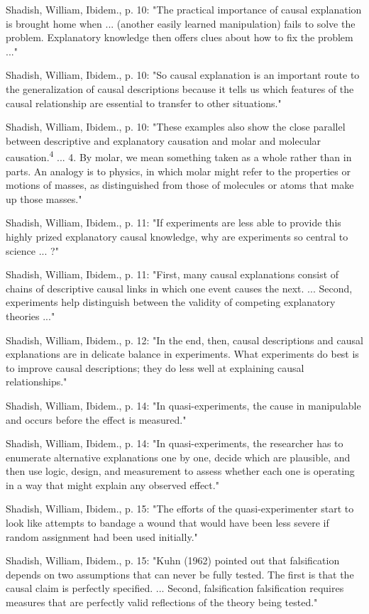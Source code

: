 Shadish, William, Ibidem., p. 10: "The practical importance of causal explanation is brought home when ... (another easily learned manipulation) fails to solve the problem. Explanatory knowledge then offers clues about how to fix the problem ..."

Shadish, William, Ibidem., p. 10: "So causal explanation is an important route to the generalization of causal descriptions because it tells us which features of the causal relationship are essential to transfer to other situations."

Shadish, William, Ibidem., p. 10: "These examples also show the close parallel between descriptive and explanatory causation and molar and molecular causation.\textsuperscript{4 }... 4. By molar, we mean something taken as a whole rather than in parts. An analogy is to physics, in which molar might refer to the properties or motions of masses, as distinguished from those of molecules or atoms that make up those masses."

Shadish, William, Ibidem., p. 11: "If experiments are less able to provide this highly prized explanatory causal knowledge, why are experiments so central to science ... ?"

Shadish, William, Ibidem., p. 11: "First, many causal explanations consist of chains of descriptive causal links in which one event causes the next. ... Second, experiments help distinguish between the validity of competing explanatory theories ..."

Shadish, William, Ibidem., p. 12: "In the end, then, causal descriptions and causal explanations are in delicate balance in experiments. What experiments do best is to improve causal descriptions; they do less well at explaining causal relationships."

Shadish, William, Ibidem., p. 14: "In quasi-experiments, the cause in manipulable and occurs before the effect is measured."

Shadish, William, Ibidem., p. 14: "In quasi-experiments, the researcher has to enumerate alternative explanations one by one, decide which are plausible, and then use logic, design, and measurement to assess whether each one is operating in a way that might explain any observed effect."

Shadish, William, Ibidem., p. 15: "The efforts of the quasi-experimenter start to look like attempts to bandage a wound that would have been less severe if random assignment had been used initially."

Shadish, William, Ibidem., p. 15: "Kuhn (1962) pointed out that falsification depends on two assumptions that can never be fully tested. The first is that the causal claim is perfectly specified. ... Second, falsification falsification requires measures that are perfectly valid reflections of the theory being tested."

